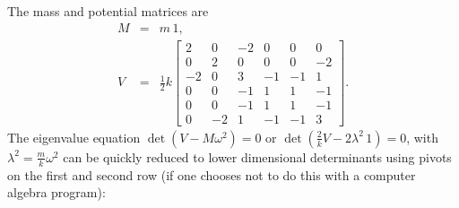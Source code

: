 \documentclass[letterpaper,11pt]{article}
\begin{document}
The mass and potential matrices are
\begin{eqnarray*}
 M & = & m\,1, \\
 V & = & \frac{1}{2} k \left[ \begin{array}{cccccc}
 2 & 0 & -2 & 0 & 0 & 0 \\
 0 & 2 & 0 & 0 & 0 & -2 \\
 -2 & 0 & 3 & -1 & -1 & 1 \\
 0 & 0 & -1 & 1 & 1 & -1 \\
 0 & 0 & -1 & 1 & 1 & -1 \\
 0 & -2 & 1 & -1 & -1 & 3
 \end{array} \right].
\end{eqnarray*}
The eigenvalue equation $\det(V - M\omega^2) = 0$ or $\det(\frac{2}{k} V - 2 \lambda^2\,1) = 0$, with $\lambda^2 =  \frac{m}{k} \omega^2$ can be quickly reduced to lower dimensional determinants using pivots on the first and second row (if one chooses not to do this with a computer algebra program):
\end{document}
